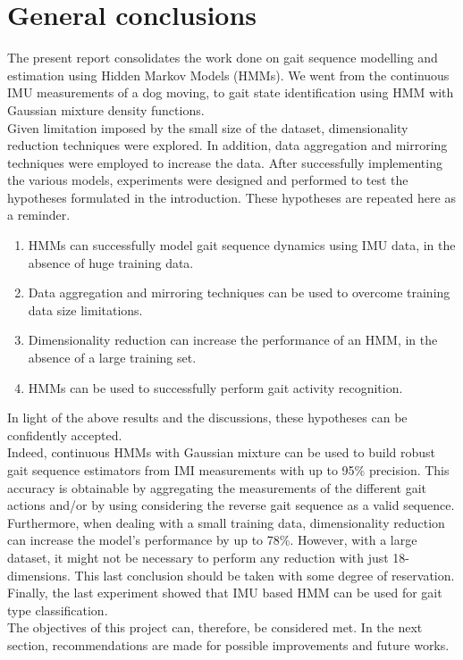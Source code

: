 \chapter{General conclusions}
The present report consolidates the work done on gait sequence modelling and estimation using Hidden Markov Models (HMMs). 
We went from the continuous IMU measurements of a dog moving, to gait state identification using HMM with Gaussian mixture density functions.\\
Given limitation imposed by the small size of the dataset, dimensionality reduction techniques were explored. In addition, data aggregation and mirroring techniques were employed to increase the data. After successfully implementing the various models, experiments were designed and performed to test the hypotheses formulated in the introduction. These hypotheses are repeated here as a reminder.
\begin{enumerate}
	\item HMMs can successfully model gait sequence dynamics using IMU data, in the absence of huge training data.
	\item Data aggregation and mirroring techniques can be used to overcome training data size limitations.
	\item Dimensionality reduction can increase the performance of an HMM, in the absence of a large training set.
	\item HMMs can be used to successfully perform gait activity recognition.
\end{enumerate}
In light of the above results and the discussions, these hypotheses can be confidently accepted. \\
Indeed, continuous HMMs with Gaussian mixture can be used to build robust gait sequence estimators from IMI measurements with up to 95\% precision.
This accuracy is obtainable by aggregating the measurements of the different gait actions and/or by using considering the reverse gait sequence as a valid sequence.\\
Furthermore, when dealing with a small training data, dimensionality reduction can increase the model's performance by up to 78\%. However, with a large dataset, it might not be necessary to perform any reduction with just 18-dimensions. This last conclusion should be taken with some degree of reservation.
Finally, the last experiment showed that IMU based HMM can be used for gait type classification.\\
The objectives of this project can, therefore, be considered met. In the next section, recommendations are made for possible improvements and future works.